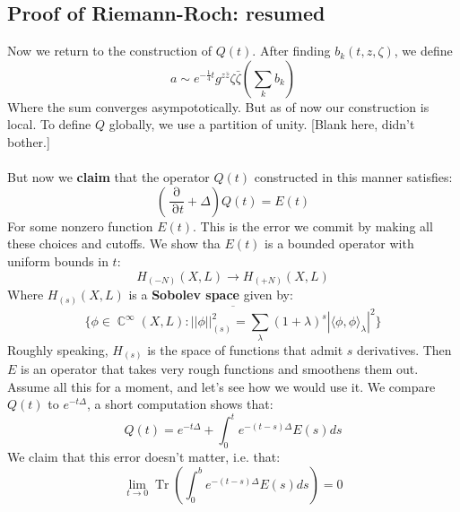 \documentclass[12 pt]{article}
\DeclareMathOperator {\p} {\partial}
\DeclareMathOperator {\C} {\mathbb{C}}
\DeclareMathOperator {\Tr}{Tr}
\theoremstyle{plain}
\theoremstyle{definition}
\theoremstyle{remark}
\begin{document}
\subsection*{Proof of Riemann-Roch: resumed}
Now we return to the construction of $Q(t)$. After finding $b_k(t,z,\zeta)$, we define
\[     a \sim e^{-\frac{1}{4}t} g^{z\bar z} \zeta \bar \zeta \left(\sum_k b_k \right)      \]
Where the sum converges asympototically. But as of now our construction is local. To define $Q$ globally, we use a partition of unity. [Blank here, didn't bother.]
\\
\\
But now we \textbf{claim} that the operator $Q(t)$ constructed in this manner satisfies:
\[           \left( \frac{\p}{\p t} + \Delta \right) Q(t) = E(t)         \]
For some nonzero function $E(t)$. This is the error we commit by making all these choices and cutoffs. We show tha $E(t)$ is a bounded operator with uniform bounds in $t$:
\[        H_{(-N)} (X,L) \to H_{(+N)} (X, L)       \]
Where $H_{(s)}(X,L)$ is a \textbf{Sobolev space} given by:
\[     \overline{  \{ \phi \in \C^{\infty}(X,L) : ||\phi||_{(s)}^2 = \sum_{\lambda} (1+ \lambda)^s| \langle \phi, \phi \rangle_{\lambda}|^2 \} }  \]
Roughly speaking, $H_{(s)}$ is the space of functions that admit $s$ derivatives. Then $E$ is an operator that takes very rough functions and smoothens them out. Assume all this for a moment, and let's see how we would use it. We compare $Q(t)$ to $e^{-t\Delta}$, a short computation shows that:
\[     Q(t) = e^{-t\Delta} + \int_0^t e^{-(t-s) \Delta} E(s) ds      \]
We claim that this error doesn't matter, i.e. that:
\[      \lim_{t\to 0} \Tr\left( \int_0^b e^{-(t-s) \Delta} E(s) ds \right) = 0     \]
\end{document}
